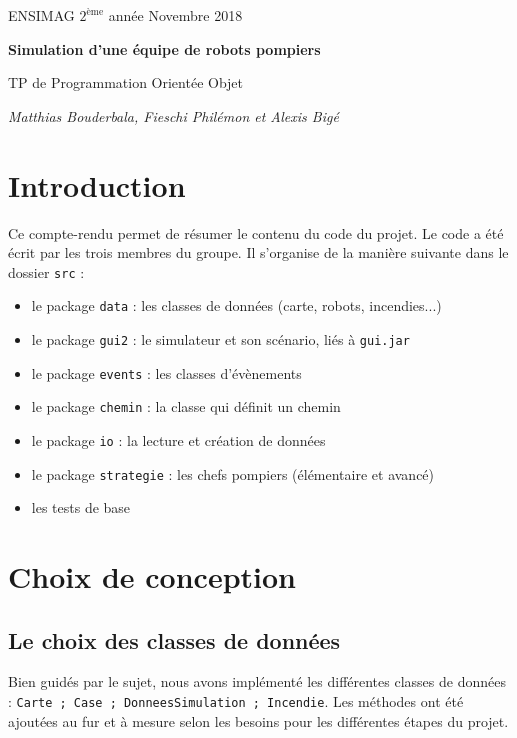 \documentclass[12pt]{article}
\newcommand{\noi}{\noindent}
\begin{document}
\baselineskip7mm

\noi ENSIMAG $2^{\mbox{ème}}$ année   \hfill Novembre 2018


\vspace{1cm}


\begin{center}
{\Large \bf Simulation d'une équipe de robots pompiers

\vspace{3mm}

\normalsize TP de Programmation Orientée Objet

\vspace{3mm}
{\it \small Matthias Bouderbala, Fieschi Philémon et Alexis Bigé}
}
\end{center}

\section{Introduction}

Ce compte-rendu permet de résumer le contenu du code du projet. Le code a été écrit par les trois membres du groupe. Il s'organise de la manière suivante dans le dossier {\tt src} :
\begin{itemize}
  \item le package {\tt data} : les classes de données (carte, robots, incendies...)
  \item le package {\tt gui2} : le simulateur et son scénario, liés à {\tt gui.jar}
  \item le package {\tt events} : les classes d'évènements
  \item le package {\tt chemin} : la classe qui définit un chemin
  \item le package {\tt io} : la lecture et création de données
  \item le package {\tt strategie} : les chefs pompiers (élémentaire et avancé)
  \item les tests de base
\end{itemize}

\section{Choix de conception}

\subsection{Le choix des classes de données}
Bien guidés par le sujet, nous avons implémenté les différentes classes de données : {\tt Carte ; Case ; DonneesSimulation ; Incendie}. Les méthodes ont été ajoutées au fur et à mesure selon les besoins pour les différentes étapes du projet.\\
\end{document}
